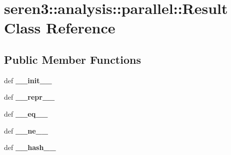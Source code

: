 \hypertarget{classseren3_1_1analysis_1_1parallel_1_1Result}{
\section{seren3::analysis::parallel::Result Class Reference}
\label{classseren3_1_1analysis_1_1parallel_1_1Result}
}
\subsection*{Public Member Functions}
\begin{DoxyCompactItemize}
\item 
\hypertarget{classseren3_1_1analysis_1_1parallel_1_1Result_a1eb0096054b0920660f64ace8b2d0763}{
def {\bfseries \_\-\_\-init\_\-\_\-}}
\label{classseren3_1_1analysis_1_1parallel_1_1Result_a1eb0096054b0920660f64ace8b2d0763}

\item 
\hypertarget{classseren3_1_1analysis_1_1parallel_1_1Result_a26128ac8c9c87f3442e1511344c4ab53}{
def {\bfseries \_\-\_\-repr\_\-\_\-}}
\label{classseren3_1_1analysis_1_1parallel_1_1Result_a26128ac8c9c87f3442e1511344c4ab53}

\item 
\hypertarget{classseren3_1_1analysis_1_1parallel_1_1Result_aa1d431534c797b95e5ebb645d48e0a03}{
def {\bfseries \_\-\_\-eq\_\-\_\-}}
\label{classseren3_1_1analysis_1_1parallel_1_1Result_aa1d431534c797b95e5ebb645d48e0a03}

\item 
\hypertarget{classseren3_1_1analysis_1_1parallel_1_1Result_ac70dee7892ecdabc8b297da01c0ff605}{
def {\bfseries \_\-\_\-ne\_\-\_\-}}
\label{classseren3_1_1analysis_1_1parallel_1_1Result_ac70dee7892ecdabc8b297da01c0ff605}

\item 
\hypertarget{classseren3_1_1analysis_1_1parallel_1_1Result_a2d32419e77779319a4f34dbc9f0860ce}{
def {\bfseries \_\-\_\-hash\_\-\_\-}}
\label{classseren3_1_1analysis_1_1parallel_1_1Result_a2d32419e77779319a4f34dbc9f0860ce}

\end{DoxyCompactItemize}
